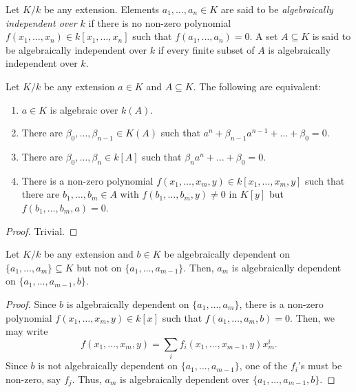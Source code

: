 \begin{definition}
    Let $K/k$ be any extension. Elements $a_1,\dots,a_n\in K$ are said to be \emph{algebraically independent over $k$} if there is no non-zero polynomial $f(x_1,\dots,x_n)\in k[x_1,\dots,x_n]$ such that $f(a_1,\dots,a_n) = 0$. A set $A\subseteq K$ is said to be algebraically independent over $k$ if every finite subset of $A$ is algebraically independent over $k$.
\end{definition}

\begin{lemma}
    Let $K/k$ be any extension $a\in K$ and $A\subseteq K$. The following are equivalent: 
    \begin{enumerate}[label=(\alph*)]
        \item $a\in K$ is algebraic over $k(A)$.
        \item There are $\beta_0,\dots,\beta_{n - 1}\in K(A)$ such that $a^n + \beta_{n - 1}a^{n - 1} + \dots + \beta_0 = 0$. 
        \item There are $\beta_0,\dots,\beta_n\in k[A]$ such that $\beta_na^n + \dots  + \beta_0= 0$.
        \item There is a non-zero polynomial $f(x_1,\dots,x_m, y)\in k[x_1,\dots,x_m, y]$ such that there are $b_1,\dots,b_m\in A$ with $f(b_1,\dots,b_m, y)\ne 0$ in $K[y]$ but $f(b_1,\dots,b_m, a) = 0$.
    \end{enumerate}
\end{lemma}
\begin{proof}
    Trivial.
\end{proof}

\begin{lemma}
    Let $K/k$ be any extension and $b\in K$ be algebraically dependent on $\{a_1,\dots,a_m\}\subseteq K$ but not on $\{a_1,\dots,a_{m - 1}\}$. Then, $a_m$ is algebraically dependent on $\{a_1,\dots,a_{m - 1}, b\}$.
\end{lemma}
\begin{proof}
    Since $b$ is algebraically dependent on $\{a_1,\dots,a_m\}$, there is a non-zero polynomial $f(x_1,\dots,x_m,y)\in k[x]$ such that $f(a_1,\dots,a_m, b) = 0$. Then, we may write 
    \begin{equation*}
        f(x_1,\dots,x_m,y) = \sum_i f_i(x_1,\dots,x_{m - 1}, y)x_m^i.
    \end{equation*}
    Since $b$ is not algebraically dependent on $\{a_1,\dots,a_{m - 1}\}$, one of the $f_i$'s must be non-zero, say $f_j$. Thus, $a_m$ is algebraically dependent over $\{a_1,\dots,a_{m - 1},b\}$.
\end{proof}

